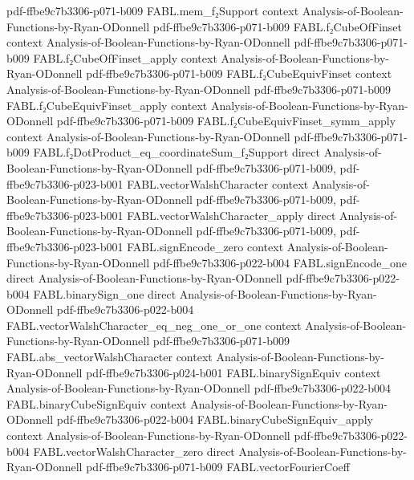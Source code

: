 \begin{theorem}
  {pdf-ffbe9c7b3306-p071-b009}
\proofstep
  {FABL.mem_f₂Support}
  {context}
  {Analysis-of-Boolean-Functions-by-Ryan-ODonnell}
  {pdf-ffbe9c7b3306-p071-b009}
\proofstep
  {FABL.f₂CubeOfFinset}
  {context}
  {Analysis-of-Boolean-Functions-by-Ryan-ODonnell}
  {pdf-ffbe9c7b3306-p071-b009}
\proofstep
  {FABL.f₂CubeOfFinset_apply}
  {context}
  {Analysis-of-Boolean-Functions-by-Ryan-ODonnell}
  {pdf-ffbe9c7b3306-p071-b009}
\proofstep
  {FABL.f₂CubeEquivFinset}
  {context}
  {Analysis-of-Boolean-Functions-by-Ryan-ODonnell}
  {pdf-ffbe9c7b3306-p071-b009}
\proofstep
  {FABL.f₂CubeEquivFinset_apply}
  {context}
  {Analysis-of-Boolean-Functions-by-Ryan-ODonnell}
  {pdf-ffbe9c7b3306-p071-b009}
\proofstep
  {FABL.f₂CubeEquivFinset_symm_apply}
  {context}
  {Analysis-of-Boolean-Functions-by-Ryan-ODonnell}
  {pdf-ffbe9c7b3306-p071-b009}
\proofstep
  {FABL.f₂DotProduct_eq_coordinateSum_f₂Support}
  {direct}
  {Analysis-of-Boolean-Functions-by-Ryan-ODonnell}
  {pdf-ffbe9c7b3306-p071-b009,
    pdf-ffbe9c7b3306-p023-b001}
\proofstep
  {FABL.vectorWalshCharacter}
  {context}
  {Analysis-of-Boolean-Functions-by-Ryan-ODonnell}
  {pdf-ffbe9c7b3306-p071-b009,
    pdf-ffbe9c7b3306-p023-b001}
\proofstep
  {FABL.vectorWalshCharacter_apply}
  {direct}
  {Analysis-of-Boolean-Functions-by-Ryan-ODonnell}
  {pdf-ffbe9c7b3306-p071-b009,
    pdf-ffbe9c7b3306-p023-b001}
\proofstep
  {FABL.signEncode_zero}
  {context}
  {Analysis-of-Boolean-Functions-by-Ryan-ODonnell}
  {pdf-ffbe9c7b3306-p022-b004}
\proofstep
  {FABL.signEncode_one}
  {direct}
  {Analysis-of-Boolean-Functions-by-Ryan-ODonnell}
  {pdf-ffbe9c7b3306-p022-b004}
\proofstep
  {FABL.binarySign_one}
  {direct}
  {Analysis-of-Boolean-Functions-by-Ryan-ODonnell}
  {pdf-ffbe9c7b3306-p022-b004}
\proofstep
  {FABL.vectorWalshCharacter_eq_neg_one_or_one}
  {context}
  {Analysis-of-Boolean-Functions-by-Ryan-ODonnell}
  {pdf-ffbe9c7b3306-p071-b009}
\proofstep
  {FABL.abs_vectorWalshCharacter}
  {context}
  {Analysis-of-Boolean-Functions-by-Ryan-ODonnell}
  {pdf-ffbe9c7b3306-p024-b001}
\proofstep
  {FABL.binarySignEquiv}
  {context}
  {Analysis-of-Boolean-Functions-by-Ryan-ODonnell}
  {pdf-ffbe9c7b3306-p022-b004}
\proofstep
  {FABL.binaryCubeSignEquiv}
  {context}
  {Analysis-of-Boolean-Functions-by-Ryan-ODonnell}
  {pdf-ffbe9c7b3306-p022-b004}
\proofstep
  {FABL.binaryCubeSignEquiv_apply}
  {context}
  {Analysis-of-Boolean-Functions-by-Ryan-ODonnell}
  {pdf-ffbe9c7b3306-p022-b004}
\proofstep
  {FABL.vectorWalshCharacter_zero}
  {direct}
  {Analysis-of-Boolean-Functions-by-Ryan-ODonnell}
  {pdf-ffbe9c7b3306-p071-b009}
\proofstep
  {FABL.vectorFourierCoeff}

\end{theorem}
